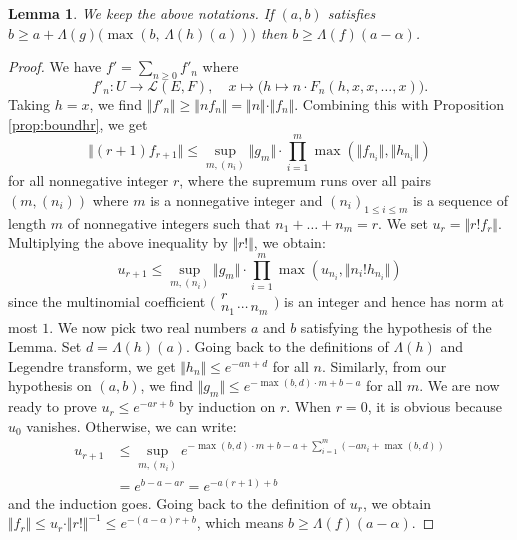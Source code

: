 \documentclass{sig-alternate}
\newtheorem{lem}[theo]{Lemma}
\def\binom#1#2{\Big(\begin{array}{cc} #1 \\ #2 \end{array}\Big)}
\begin{document}
\begin{lem}
\label{lem:boundLambdaf}
We keep the above notations. 
If $(a,b)$ satisfies
$b \geq a + \Lambda(g)\big( \! \max(b, \, \Lambda(h) (a)) \big)$
then $b \geq \Lambda(f)(a - \alpha)$.
\end{lem}

\begin{proof}
We have $f' = \sum_{n \geq 0} f'_n$ where
$$f'_n : U \to \mathcal L(E,F), \quad
x \mapsto \big(h \mapsto n \cdot F_n(h, x, x, \ldots, x)\big).$$
Taking $h = x$, we find
$\Vert f'_n \Vert \geq \Vert n f_n \Vert = 
\Vert n \Vert \cdot \Vert f_n \Vert$.
Combining this with Proposition \ref{prop:boundhr}, we get
$$\Vert (r+1) f_{r+1} \Vert \leq
  \sup_{m, (n_i)} \Vert g_m \Vert \cdot 
  \prod_{i=1}^m \max(\Vert f_{n_i} \Vert, \Vert h_{n_i} \Vert)$$
for all nonnegative integer $r$,
where the supremum runs over all pairs $(m, (n_i))$ where $m$
is a nonnegative integer and $(n_i)_{1 \leq i \leq m}$ is a sequence of
length $m$ of nonnegative integers such that $n_1 + \ldots + n_m = r$.
We set $u_r = \Vert r! f_r \Vert$. Multiplying the above inequality by
$\Vert r! \Vert$, we obtain:
\begin{equation}
\label{eq:boundurrec}
u_{r+1} \leq
  \sup_{m, (n_i)} \Vert g_m \Vert \cdot 
  \prod_{i=1}^m \max(u_{n_i}, \Vert n_i! h_{n_i} \Vert)
\end{equation}
since the multinomial coefficient $\binom r {\!n_1 \, \cdots \, n_m\!}$
is an integer and hence has norm at most $1$.
We now pick two real numbers $a$ and $b$ satisfying the hypothesis of 
the Lemma. Set $d = \Lambda(h)(a)$. Going back to the definitions of 
$\Lambda (h)$ and Legendre transform, we get $\Vert h_n \Vert \leq e^{- 
a n + d}$ for all $n$.
Similarly, from our hypothesis on $(a,b)$, we find
$\Vert g_m \Vert \leq e^{-\!\max(b,d)\cdot m + b - a}$ for all $m$.
We are now ready to prove $u_r \leq e^{-ar + b}$ by induction on $r$.
When $r = 0$, it is obvious because $u_0$ vanishes. Otherwise, we 
can write:
\begin{align*}
u_{r+1} 
& \leq \sup_{m, (n_i)}
    e^{ -\max(b,d)\cdot m + b - a + \sum_{i=1}^m (-a n_i + \max(b,d))} \\
& = e^{ b - a - a r } = e^{ -a (r+1) + b}
\end{align*}
and the induction goes. Going back to the definition of $u_r$, we obtain 
$\Vert f_r \Vert \leq u_r \cdot \Vert r! \Vert^{-1} \leq e^{-(a - \alpha) 
r + b}$, which means $b \geq \Lambda(f)(a - \alpha)$.
\end{proof}
\end{document}
